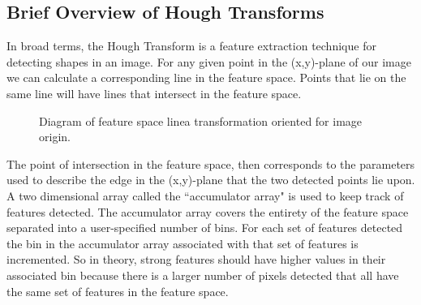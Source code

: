 \documentclass[12pt]{article}\usepackage[]{graphicx}\usepackage[]{color}
\theoremstyle{nonumberplain}
\begin{document}
\subsection{Brief Overview of Hough Transforms}



In broad terms, the Hough Transform is a feature extraction technique for detecting shapes in an image. For any given point in the (x,y)-plane of our image we can calculate a corresponding line in the feature space. Points that lie on the same line will have lines that intersect in the feature space. 
\begin{figure}[!ht]
\begin{subfigure}{.5\textwidth}
\centering
{}
\label{fig:tikz1}
\end{subfigure}
\begin{subfigure}{.5\textwidth}
\centering
{}
\label{fig:tikz2}
\end{subfigure}
\caption{Diagram of feature space linea transformation oriented for image origin.}
\label{fig:parametrization}
\end{figure}


The point of intersection in the feature space, then corresponds to the parameters used to describe the edge in the (x,y)-plane that the two detected points lie upon. A two dimensional array called the ``accumulator array" is used to keep track of features detected.  The accumulator array covers the entirety of the feature space separated into a user-specified number of bins. For each set of features detected the bin in the accumulator array associated with that set of features is incremented. So in theory, strong features should have higher values in their associated bin because there is a larger number of pixels detected that all have the same set of features in the feature space. 
\end{document}
